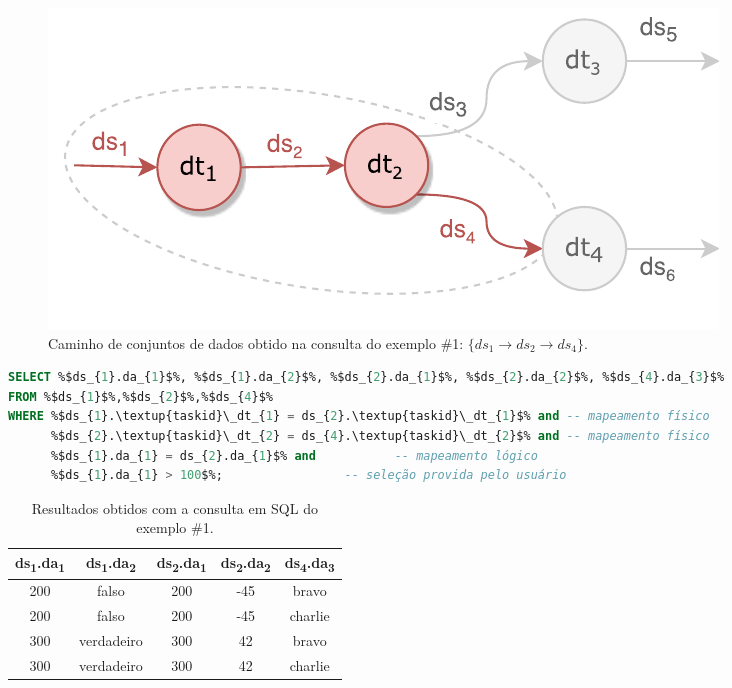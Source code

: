 \begin{figure}[!htb]
    \centering
    \includegraphics[width=\textwidth]{img/example-query-dataflow-1}
    \caption[Caminho obtido na consulta do exemplo \#1]{Caminho de conjuntos de dados obtido na consulta do exemplo \#1: \(\{ds_{1} \rightarrow ds_{2} \rightarrow ds_{4}\}.\)}%
    \label{fig:example-query-dataflow-1}
\end{figure}

\begin{minipage}[c]{0.95\textwidth}
\begin{lstlisting}[language=sql,label={lst:example-query-output-1},caption={[Código SQL gerado no exemplo~\#1]Código SQL gerado pela função \texttt{generateSqlQuery} no exemplo~\#1.}]
SELECT %$ds_{1}.da_{1}$%, %$ds_{1}.da_{2}$%, %$ds_{2}.da_{1}$%, %$ds_{2}.da_{2}$%, %$ds_{4}.da_{3}$%
FROM %$ds_{1}$%,%$ds_{2}$%,%$ds_{4}$%
WHERE %$ds_{1}.\textup{taskid}\_dt_{1} = ds_{2}.\textup{taskid}\_dt_{1}$% and -- mapeamento físico
      %$ds_{2}.\textup{taskid}\_dt_{2} = ds_{4}.\textup{taskid}\_dt_{2}$% and -- mapeamento físico
      %$ds_{1}.da_{1} = ds_{2}.da_{1}$% and           -- mapeamento lógico
      %$ds_{1}.da_{1} > 100$%;                 -- seleção provida pelo usuário
\end{lstlisting}
\end{minipage}

\begin{table}[!htb]
    \centering
    \begin{tabular}{c|c|c|c|c}
\textbf{ds\textsubscript{1}.da\textsubscript{1}} & \textbf{ds\textsubscript{1}.da\textsubscript{2}} & \textbf{ds\textsubscript{2}.da\textsubscript{1}} & \textbf{ds\textsubscript{2}.da\textsubscript{2}} & \textbf{ds\textsubscript{4}.da\textsubscript{3}} \\ \hline
200              & falso            & 200              & -45              & bravo            \\
200              & falso            & 200              & -45              & charlie          \\
300              & verdadeiro       & 300              & 42               & bravo            \\
300              & verdadeiro       & 300              & 42               & charlie         
    \end{tabular}
    \caption[Resultados obtidos com a consulta em SQL do exemplo \#1]{Resultados obtidos com a consulta em SQL do exemplo \#1.}
    \label{tab:example-query-results-1}
\end{table}